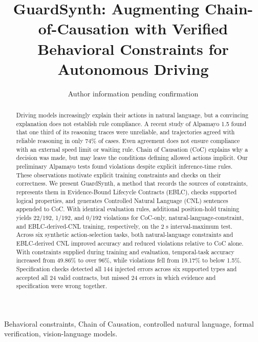 \documentclass[nolineno]{ieeeaccess}
\begin{document}
\pagestyle{headings}
\doi{}
\title{GuardSynth: Augmenting Chain-of-Causation with Verified Behavioral Constraints for Autonomous Driving}
\author{Author information pending confirmation}
\address{Affiliations and corresponding author to be confirmed}
\begin{abstract}Driving models increasingly explain their actions in natural language, but a convincing explanation does not establish rule compliance. A recent study of Alpamayo 1.5 found that one third of its reasoning traces were unreliable, and trajectories agreed with reliable reasoning in only 74\% of cases. Even agreement does not ensure compliance with an external speed limit or waiting rule. Chain of Causation (CoC) explains why a decision was made, but may leave the conditions defining allowed actions implicit. Our preliminary Alpamayo tests found violations despite explicit inference-time rules. These observations motivate explicit training constraints and checks on their correctness. We present GuardSynth, a method that records the sources of constraints, represents them in Evidence-Bound Lifecycle Contracts (EBLC), checks supported logical properties, and generates Controlled Natural Language (CNL) sentences appended to CoC. With identical evaluation rules, additional position-hold training yields 22/192, 1/192, and 0/192 violations for CoC-only, natural-language-constraint, and EBLC-derived-CNL training, respectively, on the 2 s interval-maximum test. Across six synthetic action-selection tasks, both natural-language constraints and EBLC-derived CNL improved accuracy and reduced violations relative to CoC alone. With constraints supplied during training and evaluation, temporal-task accuracy increased from 49.86\% to over 96\%, while violations fell from 19.17\% to below 1.5\%. Specification checks detected all 144 injected errors across six supported types and accepted all 24 valid contracts, but missed 24 errors in which evidence and specification were wrong together.\end{abstract}
\begin{keywords}Behavioral constraints, Chain of Causation, controlled natural language, formal verification, vision-language models.\end{keywords}
\maketitle
\end{document}
